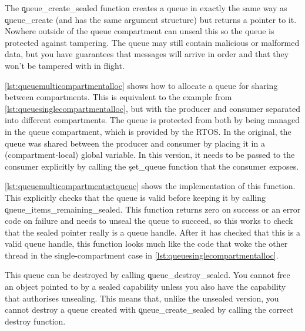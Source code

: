 The \c{queue_create_sealed} function creates a queue in exactly the same way as \c{queue_create} (and has the same argument structure) but returns a  pointer to it.
Nowhere outside of the queue compartment can unseal this so the queue is protected against tampering.
The queue may still contain malicious or malformed data, but you have guarantees that messages will arrive in order and that they won't be tampered with in flight.


\ref{lst:queuemulticompartmentalloc} shows how to allocate a queue for sharing between compartments.
This is equivalent to the example from \ref{lst:queuesinglecompartmentalloc}, but with the producer and consumer separated into different compartments.
The queue is protected from both by being managed in the queue compartment, which is provided by the RTOS.
In the original, the queue was shared between the producer and consumer by placing it in a (compartment-local) global variable.
In this version, it needs to be passed to the consumer explicitly by calling the \c{set_queue} function that the consumer exposes.

\codelisting[filename=examples/producer_consumer_compartment/producer.cc,marker=queue_allocate,label=lst:queuemulticompartmentalloc,caption="Allocating a message queue for use in a between compartments."]{}

\ref{lst:queuemulticompartmentsetqueue} shows the implementation of this function.
This explicitly checks that the queue is valid before keeping it by calling \c{queue_items_remaining_sealed}.
This function returns zero on success or an error code on failure and needs to unseal the queue to succeed, so this works to check that the sealed pointer really is a queue handle.
After it has checked that this is a valid queue handle, this function looks much like the code that woke the other thread in the single-compartment case in \ref{lst:queuesinglecompartmentalloc}.

\codelisting[filename=examples/producer_consumer_compartment/consumer.cc,marker=set_queue,label=lst:queuemulticompartmentsetqueue,caption="Receiving a queue endpoint in the consumer compartment."]{}

This queue can be destroyed by calling \c{queue_destroy_sealed}.
You cannot free an object pointed to by a sealed capability unless you also have the capability that authorises unsealing.
This means that, unlike the unsealed version, you cannot destroy a queue created with \c{queue_create_sealed}  by calling the correct destroy function.

